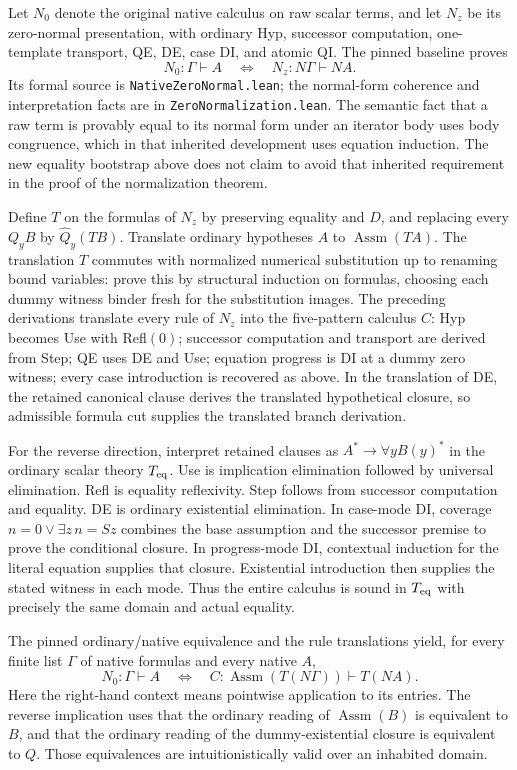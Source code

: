 \documentclass[11pt,letterpaper]{article}
\theoremstyle{definition}
\begin{document}
Let $N_0$ denote the original native calculus on raw scalar terms, and
let $N_z$ be its zero-normal presentation, with ordinary Hyp, successor
computation, one-template transport, QE, DE, case DI, and atomic QI.
The pinned baseline proves
\[
 N_0:\Gamma\vdash A
 \quad\Longleftrightarrow\quad
 N_z:N\Gamma\vdash NA.
\]
Its formal source is \texttt{NativeZeroNormal.lean}; the normal-form
coherence and interpretation facts are in
\texttt{ZeroNormalization.lean}. The semantic fact that a raw term
is provably equal to its normal form under an iterator body uses
body congruence, which in that inherited development uses equation
induction. The new equality bootstrap above does not claim to avoid
that inherited requirement in the proof of the normalization theorem.

Define $T$ on the formulas of $N_z$ by preserving equality and $D$,
and replacing every $Q_yB$ by $\widehat Q_y(TB)$. Translate ordinary
hypotheses $A$ to $\operatorname{Assm}(TA)$. The translation $T$
commutes with normalized numerical substitution up to renaming bound
variables: prove this by structural induction on formulas, choosing
each dummy witness binder fresh for the substitution images.
The preceding derivations
translate every rule of $N_z$ into the five-pattern calculus $C$:
Hyp becomes Use with Refl$(0)$; successor computation and transport
are derived from Step; QE uses DE and Use; equation progress is DI
at a dummy zero witness; every case introduction is recovered as
above. In the translation of DE, the retained canonical clause derives
the translated hypothetical closure, so admissible formula cut supplies
the translated branch derivation.

For the reverse direction, interpret retained clauses as
$A^*\to\forall yB(y)^*$ in the ordinary scalar theory $T_{\rm eq}$.
Use is implication elimination followed by universal elimination.
Refl is equality reflexivity. Step follows from successor computation
and equality. DE is ordinary existential elimination. In case-mode DI,
coverage $n=0\lor\exists z\,n=Sz$ combines the base assumption and
the successor premise to prove the conditional closure. In progress-mode
DI, contextual induction for the literal equation supplies that closure.
Existential introduction then supplies the stated witness in each mode.
Thus the entire calculus is sound in $T_{\rm eq}$ with precisely the
same domain and actual equality.

The pinned ordinary/native equivalence and the rule translations yield,
for every finite list $\Gamma$ of native formulas and every native $A$,
\[
 N_0:\Gamma\vdash A
 \quad\Longleftrightarrow\quad
 C:\operatorname{Assm}(T(N\Gamma))\vdash T(NA).
 \tag{Faithfulness}
\]
Here the right-hand context means pointwise application to its entries.
The reverse implication uses that the ordinary reading of
$\operatorname{Assm}(B)$ is equivalent to $B$, and that the ordinary
reading of the dummy-existential closure is equivalent to $Q$.
Those equivalences are intuitionistically valid over an inhabited domain.
\end{document}
